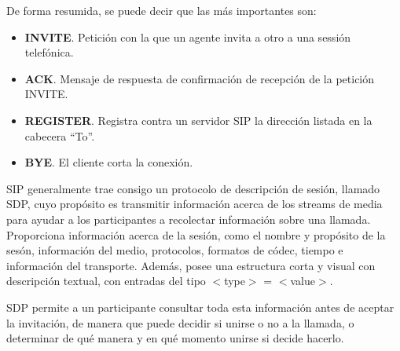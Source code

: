 \documentclass[a4paper, 12pt]{book}
\begin{document}
De forma resumida, se puede decir que las más importantes son:
\begin{itemize}
  \item \textbf{INVITE}. Petición con la que un agente invita a otro a una sessión telefónica.
  \item \textbf{ACK}. Mensaje de respuesta de confirmación de recepción de la petición INVITE.
  \item \textbf{REGISTER}. Registra contra un servidor SIP la dirección listada en la cabecera ``To''.
  \item \textbf{BYE}. El cliente corta la conexión.\\
\end{itemize}

SIP generalmente trae consigo un protocolo de descripción de sesión, llamado SDP, cuyo propósito es transmitir información acerca de los streams de media para ayudar a los participantes a recolectar información sobre una llamada. Proporciona información acerca de la sesión, como el nombre y propósito de la sesón, información del medio, protocolos, formatos de códec, tiempo e información del transporte. Además, posee una estructura corta y visual con descripción textual, con entradas del tipo $<$type$>$ = $<$value$>$.

SDP permite a un participante consultar toda esta información antes de aceptar la invitación, de manera que puede decidir si unirse o no a la llamada, o determinar de qué manera y en qué momento unirse si decide hacerlo.
\end{document}
